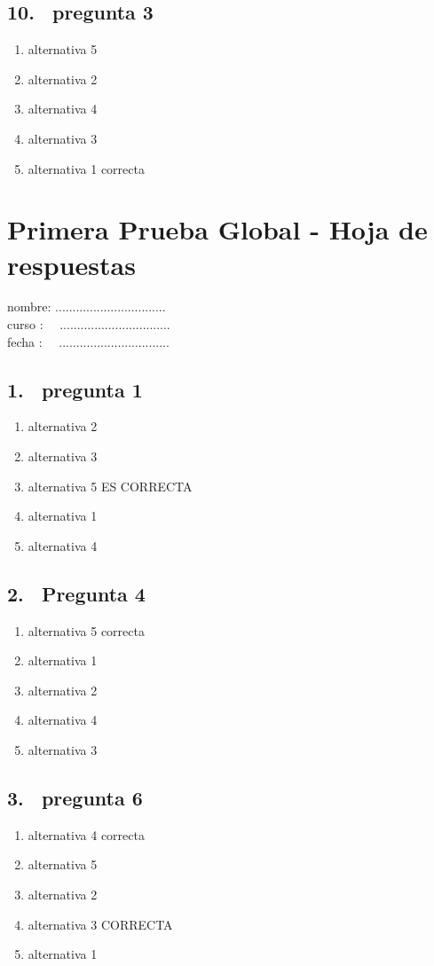 \documentclass[8pt]{article}
\begin{document}
\subsection*{10. \  pregunta 3}
\begin{enumerate}[label=(\alph*)]
\item alternativa 5
\item alternativa 2 
\item alternativa 4 
\item alternativa 3
\item alternativa 1 correcta
\end{enumerate}
\newpage
    \setcounter{page}{0}
    \setcounter{page}{1}
    \section{Primera Prueba Global - Hoja de respuestas}
    nombre:   ................................\\
curso :     \ \ ................................\\
fecha :   \ \ ................................\\
\subsection*{1. \  pregunta 1}
\begin{enumerate}[label=(\alph*)]
\item alternativa 2
\item alternativa 3 
\item alternativa 5 ES CORRECTA
\item alternativa 1
\item alternativa 4 
\end{enumerate}
\subsection*{2. \  Pregunta 4}
\begin{enumerate}[label=(\alph*)]
\item alternativa 5 correcta
\item alternativa 1 
\item alternativa 2 
\item alternativa 4
\item alternativa 3 
\end{enumerate}
\subsection*{3. \  pregunta 6}
\begin{enumerate}[label=(\alph*)]
\item alternativa 4 correcta
\item alternativa 5 
\item alternativa 2 
\item alternativa 3 CORRECTA
\item alternativa 1 
\end{enumerate}
\end{document}
